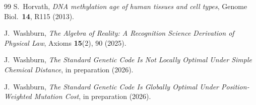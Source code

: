 \documentclass[11pt,a4paper]{article}
\begin{document}
\begin{thebibliography}{99}
S.~Horvath, \emph{DNA methylation age of human tissues and cell types}, Genome Biol.\ \textbf{14}, R115 (2013).

J.~Washburn, \emph{The Algebra of Reality: A Recognition Science Derivation of Physical Law}, Axioms \textbf{15}(2), 90 (2025).

J.~Washburn, \emph{The Standard Genetic Code Is Not Locally Optimal Under Simple Chemical Distance}, in preparation (2026).

J.~Washburn, \emph{The Standard Genetic Code Is Globally Optimal Under Position-Weighted Mutation Cost}, in preparation (2026).

\end{thebibliography}
\end{document}
